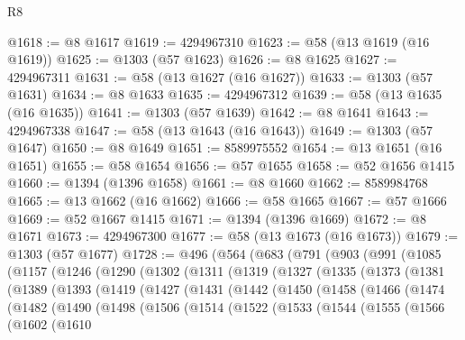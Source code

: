 \begin{lexlean}{R8}
\begin{coremodule}
@1618 := @8 @1617
@1619 := 4294967310
@1623 := @58 (@13 @1619 (@16 @1619))
@1625 := @1303 (@57 @1623)
@1626 := @8 @1625
@1627 := 4294967311
@1631 := @58 (@13 @1627 (@16 @1627))
@1633 := @1303 (@57 @1631)
@1634 := @8 @1633
@1635 := 4294967312
@1639 := @58 (@13 @1635 (@16 @1635))
@1641 := @1303 (@57 @1639)
@1642 := @8 @1641
@1643 := 4294967338
@1647 := @58 (@13 @1643 (@16 @1643))
@1649 := @1303 (@57 @1647)
@1650 := @8 @1649
@1651 := 8589975552
@1654 := @13 @1651 (@16 @1651)
@1655 := @58 @1654
@1656 := @57 @1655
@1658 := @52 @1656 @1415
@1660 := @1394 (@1396 @1658)
@1661 := @8 @1660
@1662 := 8589984768
@1665 := @13 @1662 (@16 @1662)
@1666 := @58 @1665
@1667 := @57 @1666
@1669 := @52 @1667 @1415
@1671 := @1394 (@1396 @1669)
@1672 := @8 @1671
@1673 := 4294967300
@1677 := @58 (@13 @1673 (@16 @1673))
@1679 := @1303 (@57 @1677)
@1728 := @496
    (@564
      (@683
        (@791
          (@903
            (@991
              (@1085
                (@1157
                  (@1246
                    (@1290
                      (@1302
                        (@1311
                          (@1319
                            (@1327
                              (@1335
                                (@1373
                                  (@1381
                                    (@1389
                                      (@1393
                                        (@1419
                                          (@1427
                                            (@1431
                                              (@1442
                                                (@1450
                                                  (@1458
                                                    (@1466
                                                      (@1474
                                                        (@1482
                                                          (@1490
                                                            (@1498
                                                              (@1506
                                                                (@1514
                                                                  (@1522
                                                                    (@1533
                                                                      (@1544
                                                                        (@1555
                                                                          (@1566
                                                                            (@1602
                                                                              (@1610

\end{coremodule}
\end{lexlean}
